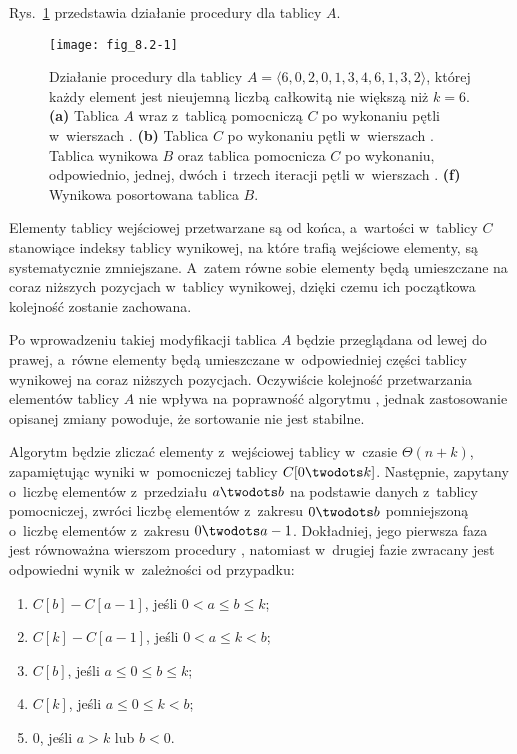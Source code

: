 
\exercise %
Rys.~\ref{fig:8.2-1} przedstawia działanie procedury  dla tablicy $A$.
\begin{figure}[ht]
	\begin{center}
		\texttt{[image: fig\_8.2-1]}
	\end{center}
	\caption{Działanie procedury  dla tablicy $A=\langle6,0,2,0,1,3,4,6,1,3,2\rangle$, której każdy element jest nieujemną liczbą całkowitą nie większą niż $k=6$.
{\sffamily\bfseries(a)} Tablica $A$ wraz z~tablicą pomocniczą $C$ po wykonaniu pętli w~wierszach .
{\sffamily\bfseries(b)} Tablica $C$ po wykonaniu pętli w~wierszach .
{\sffamily\bfseries{}} Tablica wynikowa $B$ oraz tablica pomocnicza $C$ po wykonaniu, odpowiednio, jednej, dwóch i~trzech iteracji pętli  w~wierszach .
{\sffamily\bfseries(f)} Wynikowa posortowana tablica $B$.} \label{fig:8.2-1}
\end{figure}

\exercise %
Elementy tablicy wejściowej przetwarzane są od końca, a~wartości w~tablicy $C$ stanowiące indeksy tablicy wynikowej, na które trafią wejściowe elementy, są systematycznie zmniejszane.
A~zatem równe sobie elementy będą umieszczane na coraz niższych pozycjach w~tablicy wynikowej, dzięki czemu ich początkowa kolejność zostanie zachowana.

\exercise %
Po wprowadzeniu takiej modyfikacji tablica $A$ będzie przeglądana od lewej do prawej, a~równe elementy będą umieszczane w~odpowiedniej części tablicy wynikowej na coraz niższych pozycjach.
Oczywiście kolejność przetwarzania elementów tablicy $A$ nie wpływa na poprawność algorytmu , jednak zastosowanie opisanej zmiany powoduje, że sortowanie nie jest stabilne.

\exercise %
Algorytm będzie zliczać elementy z~wejściowej tablicy w~czasie $\Theta(n+k)$, zapamiętując wyniki w~pomocniczej tablicy $C[0\twodots k]$.
Następnie, zapytany o~liczbę elementów z~przedziału $a\twodots b$ na podstawie danych z~tablicy pomocniczej, zwróci liczbę elementów z~zakresu $0\twodots b$ pomniejszoną o~liczbę elementów z~zakresu $0\twodots a-1$.
Dokładniej, jego pierwsza faza jest równoważna wierszom  procedury , natomiast w~drugiej fazie zwracany jest odpowiedni wynik w~zależności od przypadku:
\begin{enumerate}
	\renewcommand{\labelenumi}{(\roman{enumi})}
	\item $C[b]-C[a-1]$, jeśli $0<a\le b\le k$;
	\item $C[k]-C[a-1]$, jeśli $0<a\le k<b$;
	\item $C[b]$, jeśli $a\le0\le b\le k$;
	\item $C[k]$, jeśli $a\le0\le k<b$;
	\item 0, jeśli $a>k$ lub $b<0$.
\end{enumerate}

